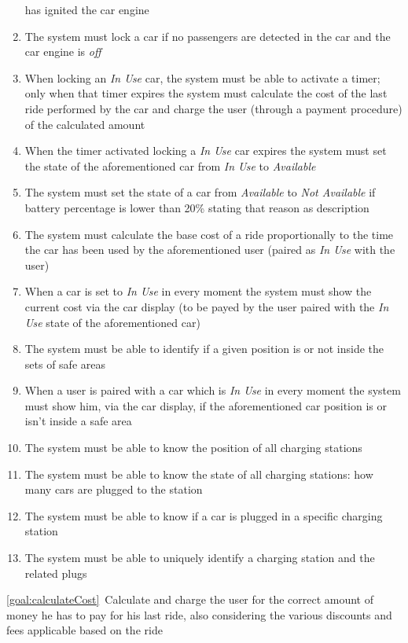 \begin{description}
\begin{enumerate}[resume*]
  				has ignited the car engine
  				\item The system must lock a car if no passengers are detected in the car and the car
  				engine is \emph{off}
  				\item When locking  an \emph{In Use} car, the system must be able to activate a timer;
  				only when that timer expires the system must calculate the cost of the last ride
  				performed by the car and charge the user (through a payment procedure) of the calculated
  				amount
  				\item When the timer activated locking a \emph{In Use} car expires the system must
  				set the state of the aforementioned car from \emph{In Use} to \emph{Available}
  				\item The system must set the state of a car from \emph{Available}
  				to \emph{Not Available} if battery percentage is lower than 20\%  stating that reason
  				as description
  				\item The system must calculate the base cost of a ride proportionally to the time
  				the car has been used by the aforementioned user (paired as \emph{In Use} with the
  				user)
  				\item When a car is set to \emph{In Use} in every moment the system must show the
  				current cost via the car display (to be payed by the user paired with the \emph{In Use}
  				state of the aforementioned car) 
  				\item The system must be able to identify if a given position is or not inside the sets
  				of safe areas
  				\item When a user is paired with a car which is \emph{In Use} in every moment the
  				system must show him, via the car display, if the aforementioned car position is or
  				isn't inside a safe area
  				\item The system must be able to know the position of all charging stations
  				\item The system must be able to know the state of all charging stations: how many
  				cars are plugged to the station
  				\item The system must be able to know if a car is plugged in a specific charging
  				station
  				\item The system must be able to uniquely identify a charging station and the related
  				plugs
   			\end{enumerate}
  		\item \ref{goal:calculateCost}\ Calculate and charge the user for the correct amount of money he has to pay for his last ride, also considering the various discounts and fees applicable based on the ride

\end{description}
